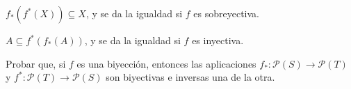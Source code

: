 \begin{ejercicio}
    $f_*(f^*(X))\subseteq X$, y se da la igualdad si $f$ es sobreyectiva.
\end{ejercicio}

\begin{ejercicio}
    $A\subseteq f^*(f_*(A))$, y se da la igualdad si $f$ es inyectiva.
\end{ejercicio}

\begin{ejercicio}
    Probar que, si $f$ es una biyección, entonces las aplicaciones $f_*:\mathcal{P}(S)\to \mathcal{P}(T)$ y $f^*:\mathcal{P}(T)\to \mathcal{P}(S)$ son biyectivas e inversas una de la otra.
\end{ejercicio}

\resetearcontador
\newpage
